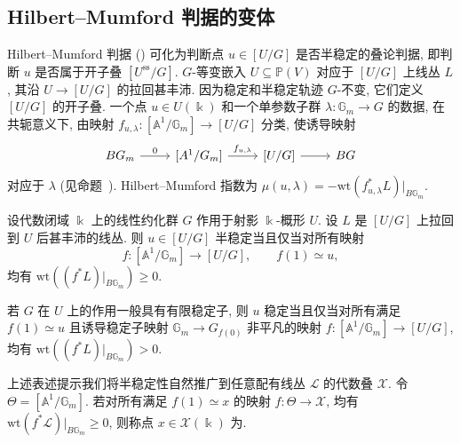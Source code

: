 \subsection{Hilbert--Mumford 判据的变体}\label{src:8.4.3-subsection}
Hilbert--Mumford 判据 () 可化为判断点 $u\in[U/G]$ 是否半稳定的叠论判据, 即判断 $u$ 是否属于开子叠 $[U^{\mathrm{ss}}/G]$. $G$-等变嵌入 $U\subseteq\mathbb P(V)$ 对应于 $[U/G]$ 上线丛 $L$, 其沿 $U\to[U/G]$ 的拉回甚丰沛. 因为稳定和半稳定轨迹 $G$-不变, 它们定义 $[U/G]$ 的开子叠. 一个点 $u\in U(\Bbbk)$ 和一个单参数子群 $\lambda:\mathbb G_m\to G$ 的数据, 在共轭意义下, 由映射 $f_{u,\lambda}:[\mathbb A^1/\mathbb G_m]\to[U/G]$ 分类, 使诱导映射
\[
\begin{tikzcd}[ampersand replacement=\&]
B\mathbb G_m\arrow[r,"0"]\&{[\mathbb A^1/\mathbb G_m]}\arrow[r,"{f_{u,\lambda}}"]\&{[U/G]}\arrow[r]\&BG
\end{tikzcd}
\]
对应于 $\lambda$ (见命题~). Hilbert--Mumford 指数为 $\mu(u,\lambda)=-\mathrm{wt}(f_{u,\lambda}^*L)|_{B\mathbb G_m}$.
\begin{corollary}\label{src:8.4.7}
设代数闭域 $\Bbbk$ 上的线性约化群 $G$ 作用于射影 $\Bbbk$-概形 $U$. 设 $L$ 是 $[U/G]$ 上拉回到 $U$ 后甚丰沛的线丛. 则 $u\in[U/G]$ 半稳定当且仅当对所有映射
\[
f:[\mathbb A^1/\mathbb G_m]\longrightarrow[U/G],\qquad f(1)\simeq u,
\]
均有 $\mathrm{wt}((f^*L)|_{B\mathbb G_m})\geq0$.

若 $G$ 在 $U$ 上的作用一般具有有限稳定子, 则 $u$ 稳定当且仅当对所有满足 $f(1)\simeq u$ 且诱导稳定子映射 $\mathbb G_m\to G_{f(0)}$ 非平凡的映射 $f:[\mathbb A^1/\mathbb G_m]\to[U/G]$, 均有 $\mathrm{wt}((f^*L)|_{B\mathbb G_m})>0$.
\end{corollary}
\begin{remark}\label{src:8.4.8}
上述表述提示我们将半稳定性自然推广到任意配有线丛 $\mathcal L$ 的代数叠 $\mathcal X$. 令 $\Theta=[\mathbb A^1/\mathbb G_m]$. 若对所有满足 $f(1)\simeq x$ 的映射 $f:\Theta\to\mathcal X$, 均有 $\mathrm{wt}(f^*\mathcal L)|_{B\mathbb G_m}\geq0$, 则称点 $x\in\mathcal X(\Bbbk)$ 为.
\end{remark}

